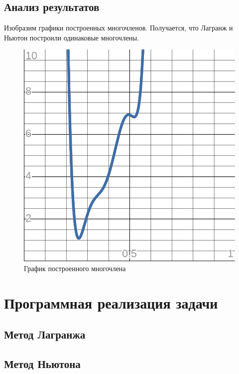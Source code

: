 \documentclass{article}
\begin{document}
\subsection{Анализ результатов}

Изобразим графики построенных многочленов.
Получается, что Лагранж и Ньютон построили
одинаковые многочлены.

\begin{figure}[h]
    \centering
    \includegraphics[totalheight=8cm]{graph.png}
    \caption{График построенного многочлена}
\end{figure}

\section{Программная реализация задачи}

\subsection{Метод Лагранжа}



\subsection{Метод Ньютона}
\end{document}
